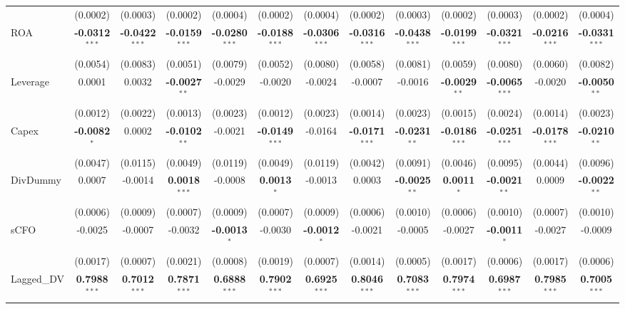 \documentclass[11pt,a4paper]{article}
\begin{document}
\begin{table}[htbp]
\begin{tabular}{lcccccccccccc}
 & (0.0002) & (0.0003) & (0.0002) & (0.0004) & (0.0002) & (0.0004) & (0.0002) & (0.0003) & (0.0002) & (0.0003) & (0.0002) & (0.0004) \\
ROA & \textbf{-0.0312}$^{***}$ & \textbf{-0.0422}$^{***}$ & \textbf{-0.0159}$^{***}$ & \textbf{-0.0280}$^{***}$ & \textbf{-0.0188}$^{***}$ & \textbf{-0.0306}$^{***}$ & \textbf{-0.0316}$^{***}$ & \textbf{-0.0438}$^{***}$ & \textbf{-0.0199}$^{***}$ & \textbf{-0.0321}$^{***}$ & \textbf{-0.0216}$^{***}$ & \textbf{-0.0331}$^{***}$ \\
 & (0.0054) & (0.0083) & (0.0051) & (0.0079) & (0.0052) & (0.0080) & (0.0058) & (0.0081) & (0.0059) & (0.0080) & (0.0060) & (0.0082) \\
Leverage & 0.0001 & 0.0032 & \textbf{-0.0027}$^{**}$ & -0.0029 & -0.0020 & -0.0024 & -0.0007 & -0.0016 & \textbf{-0.0029}$^{**}$ & \textbf{-0.0065}$^{***}$ & -0.0020 & \textbf{-0.0050}$^{**}$ \\
 & (0.0012) & (0.0022) & (0.0013) & (0.0023) & (0.0012) & (0.0023) & (0.0014) & (0.0023) & (0.0015) & (0.0024) & (0.0014) & (0.0023) \\
Capex & \textbf{-0.0082}$^{*}$ & 0.0002 & \textbf{-0.0102}$^{**}$ & -0.0021 & \textbf{-0.0149}$^{***}$ & -0.0164 & \textbf{-0.0171}$^{***}$ & \textbf{-0.0231}$^{**}$ & \textbf{-0.0186}$^{***}$ & \textbf{-0.0251}$^{***}$ & \textbf{-0.0178}$^{***}$ & \textbf{-0.0210}$^{**}$ \\
 & (0.0047) & (0.0115) & (0.0049) & (0.0119) & (0.0049) & (0.0119) & (0.0042) & (0.0091) & (0.0046) & (0.0095) & (0.0044) & (0.0096) \\
DivDummy & 0.0007 & -0.0014 & \textbf{0.0018}$^{***}$ & -0.0008 & \textbf{0.0013}$^{*}$ & -0.0013 & 0.0003 & \textbf{-0.0025}$^{**}$ & \textbf{0.0011}$^{*}$ & \textbf{-0.0021}$^{**}$ & 0.0009 & \textbf{-0.0022}$^{**}$ \\
 & (0.0006) & (0.0009) & (0.0007) & (0.0009) & (0.0007) & (0.0009) & (0.0006) & (0.0010) & (0.0006) & (0.0010) & (0.0007) & (0.0010) \\
sCFO & -0.0025 & -0.0007 & -0.0032 & \textbf{-0.0013}$^{*}$ & -0.0030 & \textbf{-0.0012}$^{*}$ & -0.0021 & -0.0005 & -0.0027 & \textbf{-0.0011}$^{*}$ & -0.0027 & -0.0009 \\
 & (0.0017) & (0.0007) & (0.0021) & (0.0008) & (0.0019) & (0.0007) & (0.0014) & (0.0005) & (0.0017) & (0.0006) & (0.0017) & (0.0006) \\
Lagged\_DV & \textbf{0.7988}$^{***}$ & \textbf{0.7012}$^{***}$ & \textbf{0.7871}$^{***}$ & \textbf{0.6888}$^{***}$ & \textbf{0.7902}$^{***}$ & \textbf{0.6925}$^{***}$ & \textbf{0.8046}$^{***}$ & \textbf{0.7083}$^{***}$ & \textbf{0.7974}$^{***}$ & \textbf{0.6987}$^{***}$ & \textbf{0.7985}$^{***}$ & \textbf{0.7005}$^{***}$ \\

\end{tabular}
\end{table}
\end{document}
